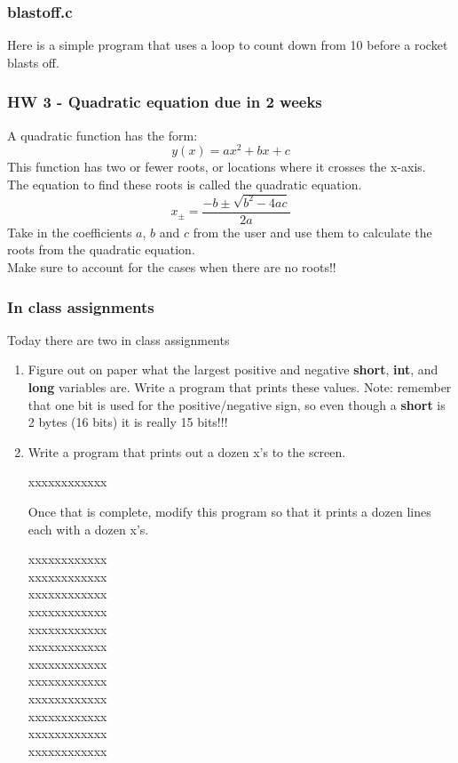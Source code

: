 \documentclass{beamer}
\begin{document}
\begin{frame}[fragile]
  \frametitle{blastoff.c}
  Here is a simple program that uses a loop to count down from 10 
  before a rocket blasts off.
  
\end{frame}

\begin{frame}
  \frametitle{HW 3 - Quadratic equation due in 2 weeks}
  A quadratic function has the form:
  \begin{equation*}
    y(x) = ax^2 + bx + c
  \end{equation*}
  This function has two or fewer roots, or locations 
  where it crosses the x-axis.\\
  The equation to find these roots is called the quadratic equation.
  \begin{equation*}
    x_\pm = \frac{-b\pm\sqrt{b^2-4ac}}{2a}
  \end{equation*}
  Take in the coefficients $a$, $b$ and $c$ from the user and use them
  to calculate the roots from the quadratic equation.\\
  Make sure to account for the cases when there are no roots!!
\end{frame}

\begin{frame}[allowframebreaks]
  \frametitle{In class assignments}
  Today there are two in class assignments
  \vspace{0.75in}
  \begin{enumerate}
  \item Figure out on paper what the largest positive and negative \textbf{short},
    \textbf{int}, and \textbf{long} variables are. Write a program that prints these
    values. Note: remember that one bit is used for the positive/negative sign,
    so even though a \textbf{short} is 2 bytes (16 bits) it is really 15 bits!!!
    \newpage
  \item Write a program that prints out a dozen x's to the screen.\\
    \begin{center}
      xxxxxxxxxxxx
    \end{center}
    Once that is complete, modify this program so that it prints a dozen lines each
    with a dozen x's.
    \begin{center}
      xxxxxxxxxxxx\\
      xxxxxxxxxxxx\\
      xxxxxxxxxxxx\\
      xxxxxxxxxxxx\\
      xxxxxxxxxxxx\\
      xxxxxxxxxxxx\\
      xxxxxxxxxxxx\\
      xxxxxxxxxxxx\\
      xxxxxxxxxxxx\\
      xxxxxxxxxxxx\\
      xxxxxxxxxxxx\\
      xxxxxxxxxxxx
    \end{center}
  \end{enumerate}
\end{frame}
\end{document}

